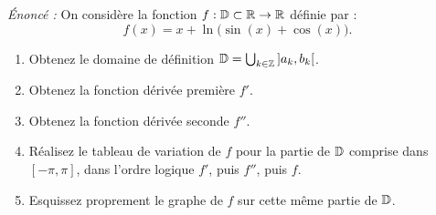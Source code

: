 \begin{exemple}
\emph{Énoncé :} On considère la fonction $f : \mathbb{D} \subset \mathbb{R} \to \mathbb{R}$ définie par :
\[
    f(x) = x + \ln\bigl(\sin(x) + \cos(x)\bigr).
\]
\begin{enumerate}[label=\alph*)]
    \item Obtenez le domaine de définition $\mathbb{D} = \bigcup_{k\in\mathbb{Z}} \,]a_k, b_k[$.
    \item Obtenez la fonction dérivée première $f'$.
    \item Obtenez la fonction dérivée seconde $f''$.
    \item Réalisez le tableau de variation de $f$ pour la partie de $\mathbb{D}$ comprise dans $[-\pi, \pi]$, dans l'ordre logique $f'$, puis $f''$, puis $f$.
    \item Esquissez proprement le graphe de $f$ sur cette même partie de $\mathbb{D}$.
\end{enumerate}


\end{exemple}
